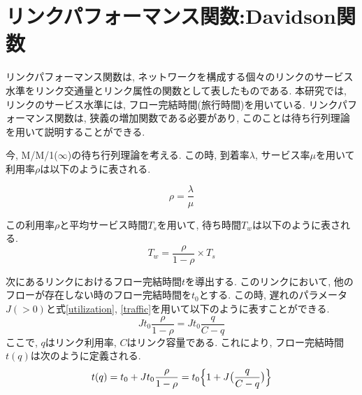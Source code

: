 \documentclass[a4paper,11pt,oneside,openany,uplatex]{jsbook}
\begin{document}
\section{リンクパフォーマンス関数:Davidson関数}
リンクパフォーマンス関数は, ネットワークを構成する個々のリンクのサービス水準をリンク交通量とリンク属性の関数として表したものである. 
本研究では, リンクのサービス水準には, フロー完結時間(旅行時間)を用いている. 
リンクパフォーマンス関数は, 狭義の増加関数である必要があり, このことは待ち行列理論を用いて説明することができる. 

今, M/M/1($\infty$)の待ち行列理論を考える. 
この時, 到着率$\lambda$, サービス率$\mu$を用いて利用率$\rho$は以下のように表される. 

\begin{equation}
\label{utilization}
\rho = \frac{\lambda}{\mu}
\end{equation}

この利用率$\rho$と平均サービス時間$T_s$を用いて, 待ち時間$T_w$は以下のように表される. 
\begin{equation}
\label{traffic}
T_w = \frac{\rho}{1-\rho} \times T_s
\end{equation}

次にあるリンクにおけるフロー完結時間$t$を導出する. 
このリンクにおいて, 他のフローが存在しない時のフロー完結時間を$t_0$とする. 
この時, 遅れのパラメータ$J(>0)$と式\ref{utilization}, \ref{traffic}を用いて以下のように表すことができる. 
\begin{equation}
\label{delay}
J t_0 \frac{\rho}{1-\rho} = J t_0 \frac{q}{C-q} 
\end{equation}
ここで, $q$はリンク利用率, $C$はリンク容量である.
これにより, フロー完結時間$t(q)$は次のように定義される. 
\begin{eqnarray}
t(q) = t_{0} + J t_{0} \frac{\rho}{1-\rho} = t_{0}\Bigl\{ 1 + J \bigl(
\frac{q}{C-q} \bigr) \Bigr\}
\end{eqnarray}
\end{document}
